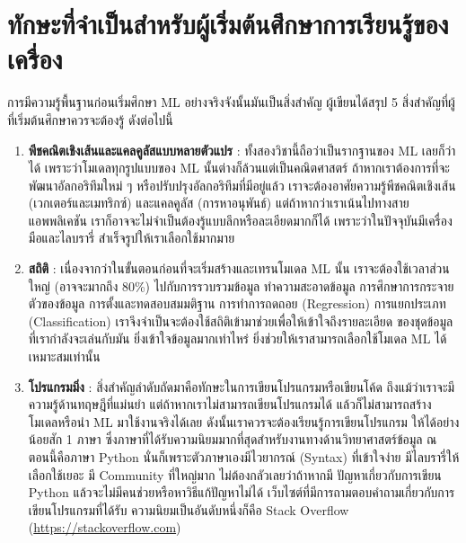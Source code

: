 \section{ทักษะที่จำเป็นสำหรับผู้เริ่มต้นศึกษาการเรียนรู้ของเครื่อง}
\label{sec:skills_for_ml}

การมีความรู้พื้นฐานก่อนเริ่มศึกษา ML อย่างจริงจังนั้นมันเป็นสิ่งสำคัญ ผู้เขียนได้สรุป 5 สิ่งสำคัญที่ผู้ที่เริ่มต้นศึกษาควรจะต้องรู้ ดังต่อไปนี้

\begin{enumerate}
    \item \textbf{พีชคณิตเชิงเส้นและแคลคูลัสแบบหลายตัวแปร} : ทั้งสองวิชานี้ถือว่าเป็นรากฐานของ ML เลยก็ว่าได้ 
    เพราะว่าโมเดลทุกรูปแบบของ ML นั้นต่างก็ล้วนแต่เป็นคณิตศาสตร์ ถ้าหากเราต้องการที่จะพัฒนาอัลกอริทึมใหม่ ๆ 
    หรือปรับปรุงอัลกอริทึมที่มีอยู่แล้ว เราจะต้องอาศัยความรู้พีชคณิตเชิงเส้น (เวกเตอร์และเมทริกซ์) และแคลคูลัส (การหาอนุพันธ์) 
    แต่ถ้าหากว่าเราเน้นไปทางสายแอพพลิเคชัน เราก็อาจจะไม่จำเป็นต้องรู้แบบลึกหรือละเอียดมากก็ได้ เพราะว่าในปัจจุบันมีเครื่องมือและไลบรารี่%
    สำเร็จรูปให้เราเลือกใช้มากมาย
    
    \item \textbf{สถิติ} : เนื่องจากว่าในขั้นตอนก่อนที่จะเริ่มสร้างและเทรนโมเดล ML นั้น เราจะต้องใช้เวลาส่วนใหญ่ 
    (อาจจะมากถึง 80\%) ไปกับการรวบรวมข้อมูล ทำความสะอาดข้อมูล การศึกษาการกระจายตัวของข้อมูล การตั้งและทดสอบสมมติฐาน 
    การทำการถดถอย (Regression) การแยกประเภท (Classification) เราจึงจำเป็นจะต้องใช้สถิติเข้ามาช่วยเพื่อให้เข้าใจถึงรายละเอียด
    ของชุดข้อมูลที่เรากำลังจะเล่นกับมัน ยิ่งเข้าใจข้อมูลมากเท่าไหร่ ยิ่งช่วยให้เราสามารถเลือกใช้โมเดล ML ได้เหมาะสมเท่านั้น 
    
    \item \textbf{โปรแกรมมิ่ง} : สิ่งสำคัญลำดับถัดมาคือทักษะในการเขียนโปรแกรมหรือเขียนโค้ด ถึงแม้ว่าเราจะมีความรู้ด้านทฤษฎีที่แม่นยำ 
    แต่ถ้าหากเราไม่สามารถเขียนโปรแกรมได้ แล้วก็ไม่สามารถสร้างโมเดลหรือนำ ML มาใช้งานจริงได้เลย ดังนั้นเราควรจะต้องเรียนรู้การเขียนโปรแกรม
    ให้ได้อย่างน้อยสัก 1 ภาษา ซึ่งภาษาที่ได้รับความนิยมมากที่สุดสำหรับงานทางด้านวิทยาศาสตร์ข้อมูล ณ ตอนนี้คือภาษา Python 
    นั่นก็เพราะตัวภาษาเองมีไวยากรณ์ (Syntax) ที่เข้าใจง่าย มีไลบรารี่ให้เลือกใช้เยอะ มี Community ที่ใหญ่มาก ไม่ต้องกลัวเลยว่าถ้าหากมี%
    ปัญหาเกี่ยวกับการเขียน Python แล้วจะไม่มีคนช่วยหรือหาวิธีแก้ปัญหาไม่ได้ เว็บไซต์ที่มีการถามตอบคำถามเกี่ยวกับการเขียนโปรแกรมที่ได้รับ%
    ความนิยมเป็นอันดับหนึ่งก็คือ Stack Overflow (\url{https://stackoverflow.com})
    

\end{enumerate}
